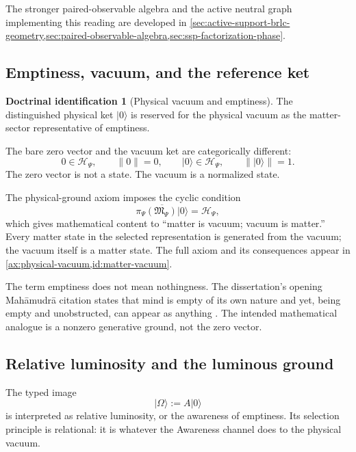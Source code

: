 \documentclass[11pt,reqno]{scrartcl}
\newcommand{\scrHP}{\mathscr H_{\Psi}}
\newcommand{\algP}{\mathfrak M_{\Psi}}
\newcommand{\piP}{\pi_{\Psi}}
\newcommand{\ket}[1]{\lvert #1\rangle}
\theoremstyle{plain}
\theoremstyle{definition}
\newtheorem{identification}[identification]{Doctrinal identification}
\theoremstyle{remark}
\begin{document}
The stronger paired-observable algebra and the active neutral graph
implementing this reading are developed in
\cref{sec:active-support-brlc-geometry,sec:paired-observable-algebra,sec:ssp-factorization-phase}.

\subsection{Emptiness, vacuum, and the reference ket}

\begin{identification}[Physical vacuum and emptiness]
\label{id:vacuum-emptiness}
The distinguished physical ket \(\ket0\) is reserved for the physical vacuum
as the matter-sector representative of emptiness.
\end{identification}

The bare zero vector and the vacuum ket are categorically different:
\begin{equation}
  0\in\scrHP,
  \qquad
  \|0\|=0,
  \qquad
  \ket0\in\scrHP,
  \qquad
  \|\ket0\|=1.
  \label{eq:zero-vacuum}
\end{equation}
The zero vector is not a state.  The vacuum is a normalized state.

The physical-ground axiom imposes the cyclic condition
\begin{equation}
  \overline{\piP(\algP)\ket0}=\scrHP,
  \label{eq:physical-cyclicity-preview}
\end{equation}
which gives mathematical content to ``matter is vacuum; vacuum is matter.''
Every matter state in the selected representation is generated from the
vacuum; the vacuum itself is a matter state.  The full axiom and its
consequences appear in \cref{ax:physical-vacuum,id:matter-vacuum}.

The term emptiness does not mean nothingness.  The dissertation's opening
Mah\=amudr\=a citation states that mind is empty of its own nature and yet,
being empty and unobstructed, can appear as anything
\cite[front matter]{Yiannopoulos2020}.  The intended mathematical analogue is
a nonzero generative ground, not the zero vector.

\subsection{Relative luminosity and the luminous ground}

The typed image
\begin{equation}
  \boxed{\ket\Omega:=A\ket0}
  \label{eq:Omega-doctrinal}
\end{equation}
is interpreted as relative luminosity, or the awareness of emptiness.  Its
selection principle is relational: it is whatever the Awareness channel does
to the physical vacuum.
\end{document}

